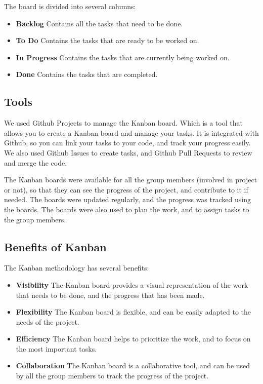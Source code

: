 \begin{spacing}{1.2}
    The board is divided into several columns:
    \begin{itemize}
        \item \textbf{Backlog} Contains all the tasks that need to be done.
        \item \textbf{To Do} Contains the tasks that are ready to be worked on.
        \item \textbf{In Progress} Contains the tasks that are currently being worked on.
        \item \textbf{Done} Contains the tasks that are completed.
    \end{itemize}

    \subsection{Tools}
    We used Github Projects to manage the Kanban board. Which is a tool that allows you to create a Kanban board
    and manage your tasks. It is integrated with Github, so you can link your tasks to your code, and track your progress
    easily. We also used Github Issues to create tasks, and Github Pull Requests to review and merge the code.

    The Kanban boards were available for all the group members (involved in project or not), so that they can see the progress
    of the project, and contribute to it if needed. The boards were updated regularly, and the progress was tracked using the
    boards. The boards were also used to plan the work, and to assign tasks to the group members.

    \subsection{Benefits of Kanban}
    The Kanban methodology has several benefits:
    \begin{itemize}
        \item \textbf{Visibility} The Kanban board provides a visual representation of the work
              that needs to be done, and the progress that has been made.
        \item \textbf{Flexibility} The Kanban board is flexible, and can be easily adapted to
              the needs of the project.
        \item \textbf{Efficiency} The Kanban board helps to prioritize the work, and to focus
              on the most important tasks.
        \item \textbf{Collaboration} The Kanban board is a collaborative tool, and can
              be used by all the group members to track the progress of the project.


\end{itemize}
\end{spacing}
